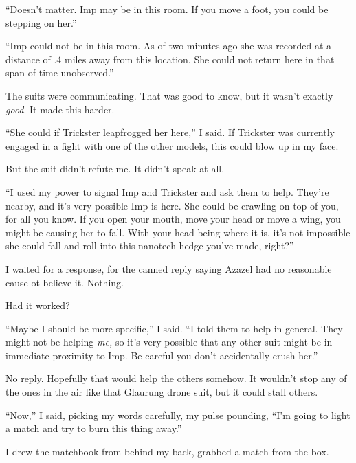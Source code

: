 ``Doesn't matter.  Imp may be in this room.  If you move a foot, you could be stepping on her.''



``Imp could not be in this room.  As of two minutes ago she was recorded at a distance of .4 miles away from this location.  She could not return here in that span of time unobserved.''



The suits were communicating.  That was good to know, but it wasn't exactly \emph{good}.  It made this harder.



``She could if Trickster leapfrogged her here,'' I said.  If Trickster was currently engaged in a fight with one of the other models, this could blow up in my face.



But the suit didn't refute me.  It didn't speak at all.



``I used my power to signal Imp and Trickster and ask them to help.  They're nearby, and it's very possible Imp is here.  She could be crawling on top of you, for all you know.  If you open your mouth, move your head or move a wing, you might be causing her to fall.  With your head being where it is, it's not impossible she could fall and roll into this nanotech hedge you've made, right?''



I waited for a response, for the canned reply saying Azazel had no reasonable cause ot believe it.  Nothing.



Had it worked?



``Maybe I should be more specific,'' I said.  ``I told them to help in general.  They might not be helping \emph{me, }so it's very possible that any other suit might be in immediate proximity to Imp.  Be careful you don't accidentally crush her.''



No reply.  Hopefully that would help the others somehow.  It wouldn't stop any of the ones in the air like that Glaurung drone suit, but it could stall others.



``Now,'' I said, picking my words carefully, my pulse pounding, ``I'm going to light a match and try to burn this thing away.''



I drew the matchbook from behind my back, grabbed a match from the box.



